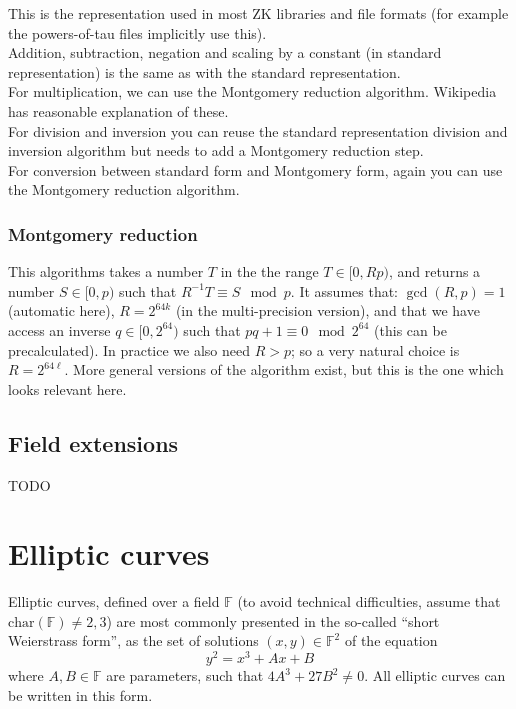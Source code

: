 \documentclass[12pt,draft,a4paper,openany,oneside]{amsbook}
\def\F{\mathbb{F}}
\theoremstyle{plain}
\theoremstyle{definition}
\begin{document}
This is the representation used in most ZK libraries and file formats (for example
the powers-of-tau files implicitly use this).\\

Addition, subtraction, negation and scaling by a constant (in standard representation) 
is the same as with the standard representation.\\

For multiplication, we can use the Montgomery reduction algorithm. Wikipedia
has reasonable explanation of these.\\

For division and inversion you can reuse the standard representation division and inversion
algorithm but needs to add a Montgomery reduction step.\\

For conversion between standard form and Montgomery form, again you can use
the Montgomery reduction algorithm.\\

\subsection{Montgomery reduction}
This algorithms takes a number $T$ in the the range $T\in[0,Rp)$, and returns
a number $S\in[0,p)$ such that $R^{-1}T\equiv S \mod p$. It assumes that:
$\gcd(R,p)=1$ (automatic here), $R=2^{64k}$ (in the multi-precision version), and that we have access
an inverse $q\in[0,2^{64})$ such that $pq + 1 \equiv 0\mod 2^{64}$ (this can be precalculated).
In practice we also need $R>p$; so a very natural choice is $R=2^{64\ell}$.
More general versions of the algorithm exist, but this is the one which looks
relevant here.


\section{Field extensions}

TODO


\chapter{Elliptic curves}

Elliptic curves, defined over a field $\F$ (to avoid technical difficulties, assume that $\mathrm{char}(\F)\neq 2,3$)
are most commonly presented in the so-called ``short Weierstrass form'',
as the set of solutions $(x,y)\in\F^2$ of the equation
\[ y^2 = x^3 + Ax + B \]
where $A,B\in\F$ are parameters, such that $4 A^3 + 27 B^2 \neq 0$. 
All elliptic curves can be written in this form.\\
\end{document}
